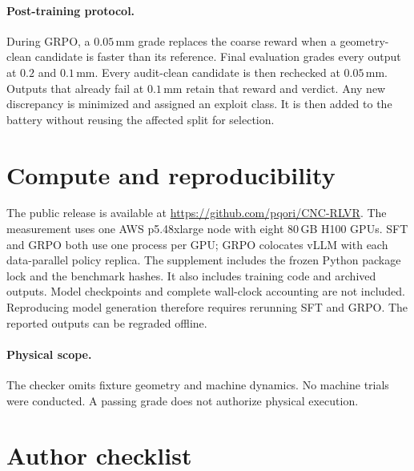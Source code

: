 \documentclass{article}
\begin{document}
\paragraph{Post-training protocol.}
During GRPO, a $0.05$\,mm grade replaces the coarse reward when a
geometry-clean candidate is faster than its reference.  Final evaluation
grades every output at $0.2$ and $0.1$\,mm.  Every audit-clean candidate
is then rechecked at $0.05$\,mm.  Outputs that already fail at
$0.1$\,mm retain that reward and verdict.  Any new
discrepancy is minimized and assigned an exploit class.  It is then added
to the battery without reusing the affected split for selection.

\section{Compute and reproducibility}
\label{app:compute}

The public release is available at \url{https://github.com/pqori/CNC-RLVR}.
The measurement uses one AWS p5.48xlarge node with eight 80\,GB H100 GPUs.
SFT and GRPO both use one process per GPU; GRPO colocates vLLM with each
data-parallel policy replica.  The supplement includes the frozen Python
package lock and the benchmark hashes.  It also includes training code and
archived outputs.  Model checkpoints and complete wall-clock accounting
are not included.  Reproducing model generation therefore requires
rerunning SFT and GRPO.  The reported outputs can be regraded offline.

\paragraph{Physical scope.}
The checker omits fixture geometry and machine dynamics.  No machine
trials were conducted.  A passing grade does not authorize physical
execution.

\section{Author checklist}


\end{document}
